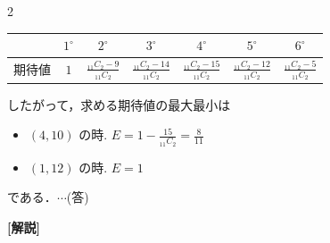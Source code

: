 \documentclass[../../../../main.tex]{subfiles}
\begin{document}
\begin{multicols}{2}
  \begin{table}
    \begin{tabular}{|c||c|c|c|c|c|c|}
      \hline
          & $1^\circ$ & $2^\circ$                       & $3^\circ$                        & $4^\circ$                        & $5^\circ$                        & $6^\circ$                       \\
      \hline
      期待値 & $1$       & $\frac{_{11}C_2 - 9}{_{11}C_2}$ & $\frac{_{11}C_2 - 14}{_{11}C_2}$ & $\frac{_{11}C_2 - 15}{_{11}C_2}$ & $\frac{_{11}C_2 - 12}{_{11}C_2}$ & $\frac{_{11}C_2 - 5}{_{11}C_2}$ \\
      \hline
    \end{tabular}
  \end{table}
  したがって，求める期待値の最大最小は
  \begin{itemize}
    \item[最小] $(4, 10)$ の時. $E = 1 - \frac{15}{_{11}C_2} = \frac{8}{11}$
    \item[最大] $(1, 12)$ の時. $E = 1$
  \end{itemize}
  である．$\cdots$(答)

  \vspace{10pt}
  {\bf[解説]}


  \newpage
\end{multicols}
\end{document}
